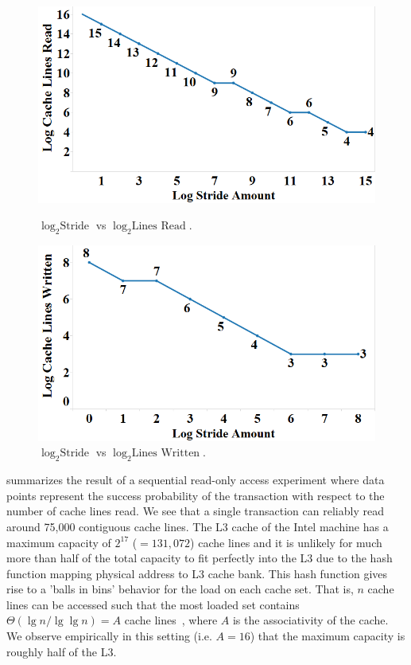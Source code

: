 \begin{figure}[h]
\centering
\begin{minipage}[b]{.45\linewidth}
\centering
\includegraphics[width=\linewidth]{images/wttm_stride_read_intel}
\vspace{-25pt}
\caption{$\log_2{\textrm{Stride}}$ vs $\log_2{\textrm{Lines Read}}$.}
\label{fig:wttm_stride_read_intel}
\end{minipage}%
\quad
\begin{minipage}[b]{.45\linewidth}
\centering
\includegraphics[width=\linewidth]{images/wttm_stride_write_intel}
\vspace{-25pt}
\caption{$\log_2{\textrm{Stride}}$ vs $\log_2{\textrm{Lines Written}}$.}
\label{fig:wttm_stride_write_intel}
\end{minipage}
\end{figure}

 summarizes the result of a sequential
read-only access experiment where data points represent the success
probability of the transaction with respect to the 
number of cache lines read.  We see that a 
single transaction can reliably read 
around 75,000 contiguous cache lines. 
The {L3} cache of the Intel machine has a maximum
capacity of $2^{17}$ ($=131,072$) cache lines and it is unlikely
for much more than half of the total capacity to 
fit perfectly into the {L3} due to
the hash function mapping physical address to L3 cache bank.
This hash function gives rise to a
'balls in bins' behavior for the load on each cache set.  That is, 
$n$ cache lines can be accessed such that
the most loaded set contains $\Theta(\lg n / \lg \lg n) = A$ 
cache lines~\cite{Gonnet81}, where $A$ is the associativity of the cache. 
We observe empirically in this setting (i.e. $A=16$) that
the maximum capacity is roughly half of the {L3}.

